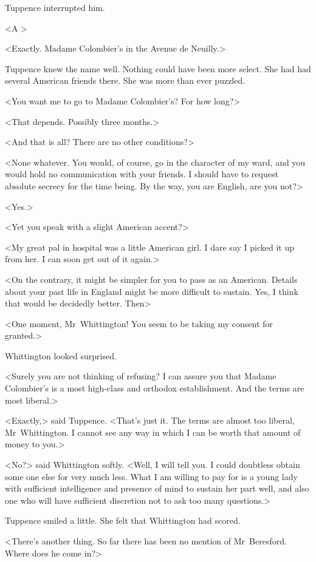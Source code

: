 Tuppence interrupted him.

<A >

<Exactly. Madame Colombier's in the Avenue de Neuilly.>

Tuppence knew the name well. Nothing could have been more select. She had had several American friends there. She was more than ever puzzled.

<You want me to go to Madame Colombier's? For how long?>

<That depends. Possibly three months.>

<And that is all? There are no other conditions?>

<None whatever. You would, of course, go in the character of my ward, and you would hold no communication with your friends. I should have to request absolute secrecy for the time being. By the way, you are English, are you not?>

<Yes.>

<Yet you speak with a slight American accent?>

<My great pal in hospital was a little American girl. I dare say I picked it up from her. I can soon get out of it again.>

<On the contrary, it might be simpler for you to pass as an American. Details about your past life in England might be more difficult to sustain. Yes, I think that would be decidedly better. Then\longdash>

<One moment, Mr~Whittington! You seem to be taking my consent for granted.>

Whittington looked surprised.

<Surely you are not thinking of refusing? I can assure you that Madame Colombier's is a most high-class and orthodox establishment. And the terms are most liberal.>

<Exactly,> said Tuppence. <That's just it. The terms are almost too liberal, Mr~Whittington. I cannot see any way in which I can be worth that amount of money to you.>

<No?> said Whittington softly. <Well, I will tell you. I could doubtless obtain some one else for very much less. What I am willing to pay for is a young lady with sufficient intelligence and presence of mind to sustain her part well, and also one who will have sufficient discretion not to ask too many questions.>

Tuppence smiled a little. She felt that Whittington had scored.

<There's another thing. So far there has been no mention of Mr~Beresford. Where does he come in?>

